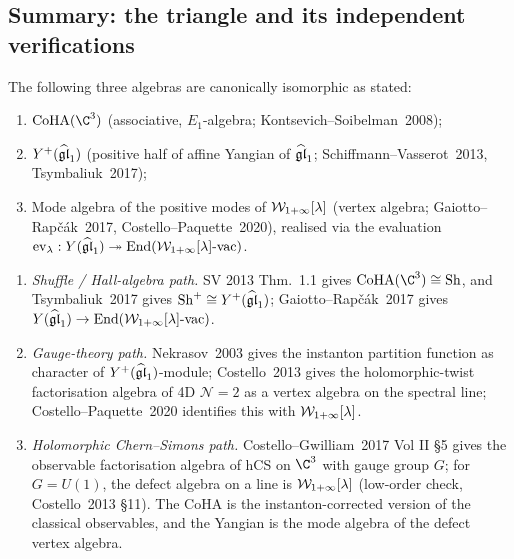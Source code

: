 \subsection{Summary: the triangle and its independent verifications}
\label{opus:sec:summary}

\begin{theorem}
\label{opus:thm:triangle}
The following three algebras are canonically isomorphic as stated:
\begin{enumerate}
\item $\CoHA(\C^3)$ (associative, $E_1$-algebra; Kontsevich--Soibelman~2008);
\item $Y^+(\widehat{\mathfrak{gl}}_1)$ (positive half of affine Yangian of $\widehat{\mathfrak{gl}}_1$; Schiffmann--Vasserot~2013,
Tsymbaliuk~2017);
\item Mode algebra of the positive modes of $\mathcal{W}_{1+\infty}[\lambda]$ (vertex algebra;
Gaiotto--Rap\v c\'ak~2017, Costello--Paquette~2020), realised via the evaluation
$\mathrm{ev}_\lambda : Y(\widehat{\mathfrak{gl}}_1) \twoheadrightarrow \mathrm{End}(\mathcal{W}_{1+\infty}[\lambda]\text{-vac})$.
\end{enumerate}
\end{theorem}

\begin{verification}
\label{opus:verif:triangle}
\mbox{}
\begin{enumerate}
\item \emph{Shuffle / Hall-algebra path.} SV 2013 Thm.~1.1 gives $\CoHA(\C^3) \cong \Sh$,
and Tsymbaliuk~2017 gives $\mathrm{Sh}^+ \cong Y^+(\widehat{\mathfrak{gl}}_1)$; Gaiotto--Rap\v c\'ak~2017 gives
$Y(\widehat{\mathfrak{gl}}_1) \to \mathrm{End}(\mathcal{W}_{1+\infty}[\lambda]\text{-vac})$.
\item \emph{Gauge-theory path.} Nekrasov~2003 gives the instanton partition function
as character of $Y^+(\widehat{\mathfrak{gl}}_1)$-module; Costello~2013 gives the holomorphic-twist
factorisation algebra of 4D $\mathcal{N} = 2$ as a vertex algebra on the spectral line;
Costello--Paquette~2020 identifies this with $\mathcal{W}_{1+\infty}[\lambda]$.
\item \emph{Holomorphic Chern--Simons path.} Costello--Gwilliam~2017 Vol II \S5 gives
the observable factorisation algebra of hCS on $\C^3$ with gauge group $G$; for $G = U(1)$,
the defect algebra on a line is $\mathcal{W}_{1+\infty}[\lambda]$ (low-order check, Costello~2013 \S11).
The CoHA is the instanton-corrected version of the classical observables, and the
Yangian is the mode algebra of the defect vertex algebra.
\end{enumerate}
\end{verification}

